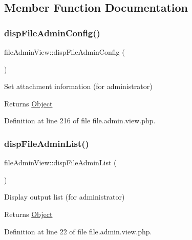 \subsection{Member Function Documentation}
\hypertarget{classfileAdminView_a6f748df78cc1df3dd8948dca1a7a04ae}{}\label{classfileAdminView_a6f748df78cc1df3dd8948dca1a7a04ae} 
\subsubsection{\texorpdfstring{disp\+File\+Admin\+Config()}{dispFileAdminConfig()}}
{\footnotesize\ttfamily file\+Admin\+View\+::disp\+File\+Admin\+Config (\begin{DoxyParamCaption}{ }\end{DoxyParamCaption})}

Set attachment information (for administrator)

\begin{DoxyReturn}{Returns}
\hyperlink{classObject}{Object} 
\end{DoxyReturn}


Definition at line 216 of file file.\+admin.\+view.\+php.

\hypertarget{classfileAdminView_aba3607fab303d106fdf650c9a79dc753}{}\label{classfileAdminView_aba3607fab303d106fdf650c9a79dc753} 
\subsubsection{\texorpdfstring{disp\+File\+Admin\+List()}{dispFileAdminList()}}
{\footnotesize\ttfamily file\+Admin\+View\+::disp\+File\+Admin\+List (\begin{DoxyParamCaption}{ }\end{DoxyParamCaption})}

Display output list (for administrator)

\begin{DoxyReturn}{Returns}
\hyperlink{classObject}{Object} 
\end{DoxyReturn}


Definition at line 22 of file file.\+admin.\+view.\+php.

\hypertarget{classfileAdminView_a0467616ea8da4c869f29f1660505e04d}{}\label{classfileAdminView_a0467616ea8da4c869f29f1660505e04d} 
